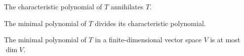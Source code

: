 \documentclass[11pt]{article}
\newcommand{\dim}{\operatorname{dim}}
\theoremstyle{definition}
\theoremstyle{remark}
\numberwithin{equation}{section}
\begin{document}
    \begin{theorem}
        The characteristic polynomial of $T$ annihilates $T$.
    \end{theorem}
    \begin{corollary}
        The minimal polynomial of $T$ divides its characteristic polynomial.
    \end{corollary}
    \begin{corollary}
        The minimal polynomial of $T$ in a finite-dimensional vector space $V$ is
        at most $\dim{V}$.
    \end{corollary}

    
\end{document}
